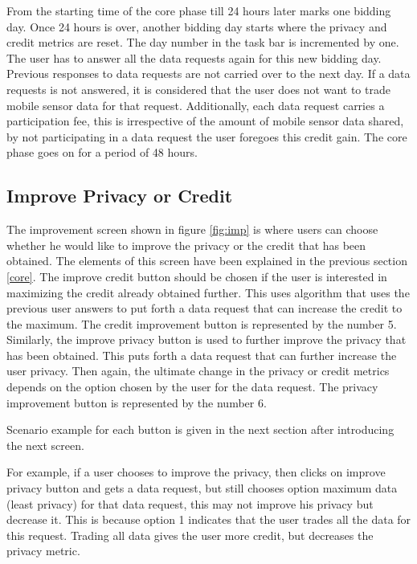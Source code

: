 From the starting time of the core phase till 24 hours later marks one bidding day. Once 24 hours is over, another bidding day starts where the privacy and credit metrics are reset. The day number in the task bar is incremented by one. The user has to answer all the data requests again for this new bidding day. Previous responses to data requests are not carried over to the next day. If a data requests is not answered, it is considered that the user does not want to trade mobile sensor data for that request. Additionally, each data request carries a participation fee, this is irrespective of the amount of mobile sensor data shared, by not participating in a data request the user foregoes this credit gain.
The core phase goes on for a period of 48 hours. 

\subsection{Improve Privacy or Credit}

The improvement screen shown in figure \ref{fig:imp} is where users can choose whether he would like to improve the privacy or the credit that has been obtained. The elements of this screen  have been explained in the previous section \ref{core}.
The improve credit button
should be chosen if the user is interested in maximizing the credit already obtained further. This uses algorithm that uses the previous user answers to
put forth a data request that can increase the credit to the maximum. The credit improvement button is represented by the number 5. Similarly, the improve privacy button is used to further improve the privacy that has been obtained. This puts forth a data request that can further increase the user privacy. Then again, the ultimate change in the privacy or credit metrics depends on
the option chosen by the user for the data request. The privacy improvement button is represented by the number 6.

Scenario example for each button is given in the next section after introducing the next screen.

For example, if a user chooses to improve the privacy, then clicks on improve privacy button and gets a data request, but still chooses option maximum data (least privacy) for that data request, this may not improve his privacy but decrease it. This is because option 1 indicates that the user trades all the data for this request. Trading all data gives the user more credit, but decreases the privacy metric.

